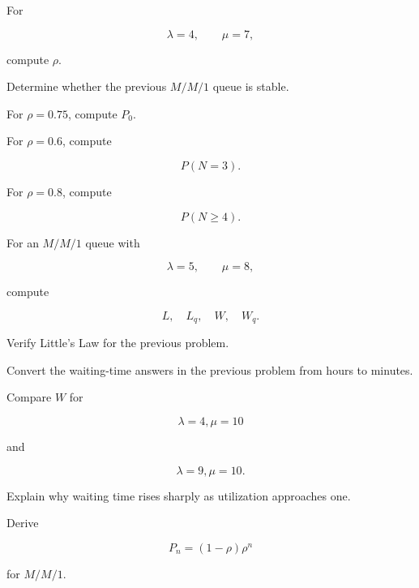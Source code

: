 \begin{exercise}[2]
For

\[
\lambda=4,
\qquad
\mu=7,
\]

compute \(\rho\).
\end{exercise}

\begin{exercise}[2]
Determine whether the previous \(M/M/1\) queue is stable.
\end{exercise}

\begin{exercise}[2]
For \(\rho=0.75\), compute \(P_0\).
\end{exercise}

\begin{exercise}[2]
For \(\rho=0.6\), compute

\[
P(N=3).
\]
\end{exercise}

\begin{exercise}[2]
For \(\rho=0.8\), compute

\[
P(N\geq4).
\]
\end{exercise}

\begin{exercise}[3]
For an \(M/M/1\) queue with

\[
\lambda=5,
\qquad
\mu=8,
\]

compute

\[
L,
\quad
L_q,
\quad
W,
\quad
W_q.
\]
\end{exercise}

\begin{exercise}[3]
Verify Little's Law for the previous problem.
\end{exercise}

\begin{exercise}[3]
Convert the waiting-time answers in the previous problem from hours to
minutes.
\end{exercise}

\begin{exercise}[3]
Compare \(W\) for

\[
\lambda=4,\mu=10
\]

and

\[
\lambda=9,\mu=10.
\]
\end{exercise}

\begin{exercise}[3]
Explain why waiting time rises sharply as utilization approaches one.
\end{exercise}

\begin{exercise}[3]
Derive

\[
P_n
=
(1-\rho)\rho^n
\]

for \(M/M/1\).
\end{exercise}

